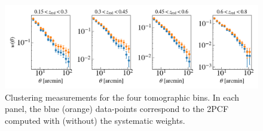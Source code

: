 \documentclass[fleqn,usenatbib,useAMS]{mnras}
\begin{document}



%






\begin{figure}
\includegraphics[width=\textwidth]{figures_tmp/xi.png}
\caption{\label{fig:xi} Clustering measurements for the four tomographic bins. In each panel, the blue (orange) data-points correspond to the 2PCF computed with (without) the systematic weights.} 
\end{figure}
\end{document}
